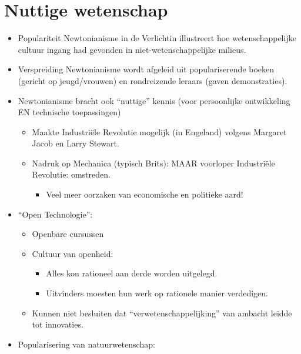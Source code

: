 \documentclass{article}
\begin{document}
  \newpage
  \section{Nuttige wetenschap}
    \begin{itemize}
      \item Populariteit Newtonianisme in de Verlichtin illustreert hoe wetenschappelijke cultuur ingang had gevonden in niet-wetenschappelijke milieus.
      \item Verspreiding Newtonianisme wordt afgeleid uit populariserende boeken (gericht op jeugd/vrouwen) en rondreizende leraars (gaven demonstraties).
      \item Newtonianisme bracht ook ``nuttige'' kennis (voor persoonlijke ontwikkeling EN technische toepassingen)
      \begin{itemize}
        \item Maakte Industri\"ele Revolutie mogelijk (in Engeland) volgens Margaret Jacob en Larry Stewart.
        \item Nadruk op Mechanica (typisch Brits): MAAR voorloper Industri\"ele Revolutie: omstreden.
        \begin{itemize}
          \item Veel meer oorzaken van economische en politieke aard!
        \end{itemize}
      \end{itemize}
      \item ``Open Technologie'':
      \begin{itemize}
        \item Openbare cursussen
        \item Cultuur van openheid: 
        \begin{itemize}
          \item Alles kon rationeel aan derde worden uitgelegd.
          \item Uitvinders moesten hun werk op rationele manier verdedigen.
        \end{itemize}
        \item Kunnen niet besluiten dat ``verwetenschappelijking'' van ambacht leidde tot innovaties.
      \end{itemize}
      \item Popularisering van natuurwetenschap: 
      \begin{itemize}

\end{itemize}
\end{itemize}
\end{document}
